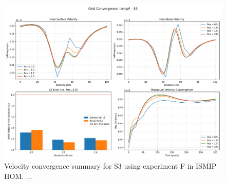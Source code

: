 \begin{figure}[H]
    \includegraphics[scale=0.49]{IsmipF_S3_convergence_summary.png}
    \caption{Velocity convergence summary for S3 using experiment F in ISMIP HOM. ... }
    \label{fig:grid_conv}
\end{figure}





